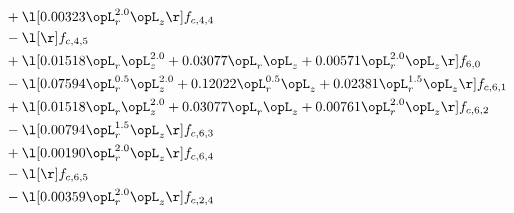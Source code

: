 \begin{alignat}{2}
& + \l[  0.00323 \opL_r^{2.0} \opL_z  \r] f_{c,4,4} \nonumber \\ 
& - \l[  \r] f_{c,4,5} \nonumber \\ 
& + \l[  0.01518 \opL_r \opL_z^{2.0} +  0.03077 \opL_r \opL_z +  0.00571 \opL_r^{2.0} \opL_z  \r] f_{6,0} \nonumber \\ 
& - \l[  0.07594 \opL_r^{0.5} \opL_z^{2.0} +  0.12022 \opL_r^{0.5} \opL_z +  0.02381 \opL_r^{1.5} \opL_z  \r] f_{c,6,1} \nonumber \\ 
& + \l[  0.01518 \opL_r \opL_z^{2.0} +  0.03077 \opL_r \opL_z +  0.00761 \opL_r^{2.0} \opL_z  \r] f_{c,6,2} \nonumber \\ 
& - \l[  0.00794 \opL_r^{1.5} \opL_z  \r] f_{c,6,3} \nonumber \\ 
& + \l[  0.00190 \opL_r^{2.0} \opL_z  \r] f_{c,6,4} \nonumber \\ 
& - \l[  \r] f_{c,6,5} \nonumber \\ 
& - \l[  0.00359 \opL_r^{2.0} \opL_z  \r] f_{c,2,4} \nonumber \\ 
\end{alignat} 


